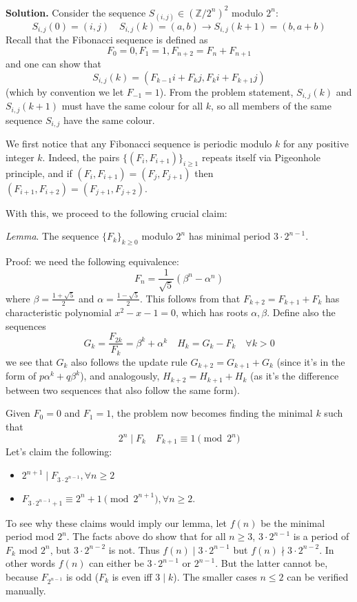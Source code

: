 \documentclass[11pt]{article}
\newcommand{\bbZ}{\mathbb Z}
\newcommand{\<}{\langle}
\renewcommand{\>}{\rangle}
\begin{document}
\begin{enumerate}
	\textbf{Solution.} Consider the sequence $S_{(i, j)}\in (\bbZ/2^n)^2$ modulo $2^n$: 
	\[
	S_{i, j}(0)=(i, j)\quad S_{i, j}(k) = (a, b)\to S_{i, j}(k+1)=(b, a+b) 
	\]
	Recall that the Fibonacci sequence is defined as
	\[
	F_0=0, F_1=1, F_{n+2}=F_n+F_{n+1}
	\]
	and one can show that 
	\[
	S_{i, j}(k)=(F_{k-1}i+F_{k}j, F_{k}i+F_{k+1}j)
	\]
	(which by convention we let $F_{-1}=1$). 
	From the problem statement, $S_{i, j}(k)$ and $S_{i, j}(k+1)$ must have the same colour for all $k$, 
	so all members of the same sequence $S_{i, j}$ have the same colour. 
	
	We first notice that any Fibonacci sequence is periodic modulo $k$ for any positive integer $k$. Indeed, the pairs $\{(F_i, F_{i+1})\}_{i\ge 1}$ repeats itself via Pigeonhole principle, and if $(F_i, F_{i+1})=(F_j, F_{j+1})$ then $(F_{i+1}, F_{i+2})=(F_{j+1}, F_{j+2})$. 
	
	With this, we proceed to the following crucial claim: 
	
	\emph{Lemma}. The sequence $\{F_k\}_{k\ge 0}$ modulo $2^n$ has minimal period $3\cdot 2^{n-1}$. 
	
	Proof: we need the following equivalence: 
	\[
	F_n=\frac{1}{\sqrt{5}}(\beta^n-\alpha^n)
	\]
	where $\beta=\frac{1+\sqrt{5}}{2}$ and $\alpha=\frac{1-\sqrt{5}}{2}$. 
	This follows from that $F_{k+2}=F_{k+1}+F_k$ has characteristic polynomial $x^2-x-1=0$, which has roots $\alpha, \beta$. 
	Define also the sequences
	\[
	G_k = \frac{F_{2k}}{F_k}=\beta^k+\alpha^k \quad H_k = G_k-F_k\quad \forall k>0
	\]
	we see that $G_k$ also follows the update rule $G_{k+2}=G_{k+1}+G_k$ 
	(since it's in the form of $p\alpha^k+q\beta^k$), 
	and analogously, $H_{k+2}=H_{k+1}+H_k$ (as it's the difference between two sequences that also follow the same form). 
	
	Given $F_0=0$ and $F_1=1$, the problem now becomes finding the minimal $k$ such that 
	\[
	2^n\mid F_k\quad F_{k+1}\equiv 1\pmod{2^n}
	\]
	Let's claim the following: 
	\begin{itemize}
		\item $2^{n+1}\mid F_{3\cdot 2^{n-1}}, \forall n\ge 2$
		\item $F_{3\cdot 2^{n-1}+1}\equiv 2^n+1\pmod{2^{n+1}}, \forall n\ge 2$.  
	\end{itemize}
    To see why these claims would imply our lemma, let $f(n)$ be the minimal period mod $2^n$. 
    The facts above do show that for all $n\ge 3$, $3\cdot 2^{n-1}$ is a period of $F_k$ mod $2^n$, but $3\cdot 2^{n-2}$ is not. 
    Thus $f(n)\mid 3\cdot 2^{n-1}$ but $f(n)\nmid 3\cdot 2^{n-2}$. In other words $f(n)$ can either be $3\cdot 2^{n-1}$ or $2^{n-1}$. But the latter cannot be, because $F_{2^{n-1}}$ is odd ($F_k$ is even iff $3\mid k$). 
    The smaller cases $n\le 2$ can be verified manually. 
    

\end{enumerate}
\end{document}
